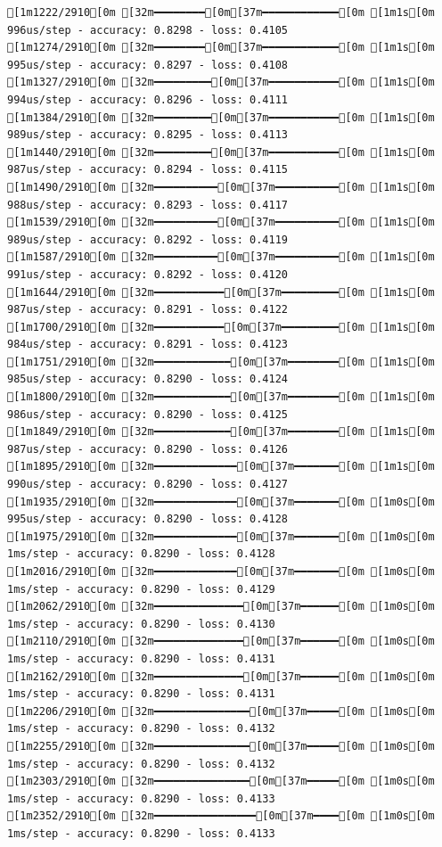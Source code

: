 \documentclass[
  letterpaper,
  DIV=11,
  numbers=noendperiod]{scrartcl}
\begin{document}
\begin{verbatim}
[1m1222/2910[0m [32m━━━━━━━━[0m[37m━━━━━━━━━━━━[0m [1m1s[0m 996us/step - accuracy: 0.8298 - loss: 0.4105
[1m1274/2910[0m [32m━━━━━━━━[0m[37m━━━━━━━━━━━━[0m [1m1s[0m 995us/step - accuracy: 0.8297 - loss: 0.4108
[1m1327/2910[0m [32m━━━━━━━━━[0m[37m━━━━━━━━━━━[0m [1m1s[0m 994us/step - accuracy: 0.8296 - loss: 0.4111
[1m1384/2910[0m [32m━━━━━━━━━[0m[37m━━━━━━━━━━━[0m [1m1s[0m 989us/step - accuracy: 0.8295 - loss: 0.4113
[1m1440/2910[0m [32m━━━━━━━━━[0m[37m━━━━━━━━━━━[0m [1m1s[0m 987us/step - accuracy: 0.8294 - loss: 0.4115
[1m1490/2910[0m [32m━━━━━━━━━━[0m[37m━━━━━━━━━━[0m [1m1s[0m 988us/step - accuracy: 0.8293 - loss: 0.4117
[1m1539/2910[0m [32m━━━━━━━━━━[0m[37m━━━━━━━━━━[0m [1m1s[0m 989us/step - accuracy: 0.8292 - loss: 0.4119
[1m1587/2910[0m [32m━━━━━━━━━━[0m[37m━━━━━━━━━━[0m [1m1s[0m 991us/step - accuracy: 0.8292 - loss: 0.4120
[1m1644/2910[0m [32m━━━━━━━━━━━[0m[37m━━━━━━━━━[0m [1m1s[0m 987us/step - accuracy: 0.8291 - loss: 0.4122
[1m1700/2910[0m [32m━━━━━━━━━━━[0m[37m━━━━━━━━━[0m [1m1s[0m 984us/step - accuracy: 0.8291 - loss: 0.4123
[1m1751/2910[0m [32m━━━━━━━━━━━━[0m[37m━━━━━━━━[0m [1m1s[0m 985us/step - accuracy: 0.8290 - loss: 0.4124
[1m1800/2910[0m [32m━━━━━━━━━━━━[0m[37m━━━━━━━━[0m [1m1s[0m 986us/step - accuracy: 0.8290 - loss: 0.4125
[1m1849/2910[0m [32m━━━━━━━━━━━━[0m[37m━━━━━━━━[0m [1m1s[0m 987us/step - accuracy: 0.8290 - loss: 0.4126
[1m1895/2910[0m [32m━━━━━━━━━━━━━[0m[37m━━━━━━━[0m [1m1s[0m 990us/step - accuracy: 0.8290 - loss: 0.4127
[1m1935/2910[0m [32m━━━━━━━━━━━━━[0m[37m━━━━━━━[0m [1m0s[0m 995us/step - accuracy: 0.8290 - loss: 0.4128
[1m1975/2910[0m [32m━━━━━━━━━━━━━[0m[37m━━━━━━━[0m [1m0s[0m 1ms/step - accuracy: 0.8290 - loss: 0.4128  
[1m2016/2910[0m [32m━━━━━━━━━━━━━[0m[37m━━━━━━━[0m [1m0s[0m 1ms/step - accuracy: 0.8290 - loss: 0.4129
[1m2062/2910[0m [32m━━━━━━━━━━━━━━[0m[37m━━━━━━[0m [1m0s[0m 1ms/step - accuracy: 0.8290 - loss: 0.4130
[1m2110/2910[0m [32m━━━━━━━━━━━━━━[0m[37m━━━━━━[0m [1m0s[0m 1ms/step - accuracy: 0.8290 - loss: 0.4131
[1m2162/2910[0m [32m━━━━━━━━━━━━━━[0m[37m━━━━━━[0m [1m0s[0m 1ms/step - accuracy: 0.8290 - loss: 0.4131
[1m2206/2910[0m [32m━━━━━━━━━━━━━━━[0m[37m━━━━━[0m [1m0s[0m 1ms/step - accuracy: 0.8290 - loss: 0.4132
[1m2255/2910[0m [32m━━━━━━━━━━━━━━━[0m[37m━━━━━[0m [1m0s[0m 1ms/step - accuracy: 0.8290 - loss: 0.4132
[1m2303/2910[0m [32m━━━━━━━━━━━━━━━[0m[37m━━━━━[0m [1m0s[0m 1ms/step - accuracy: 0.8290 - loss: 0.4133
[1m2352/2910[0m [32m━━━━━━━━━━━━━━━━[0m[37m━━━━[0m [1m0s[0m 1ms/step - accuracy: 0.8290 - loss: 0.4133

\end{verbatim}
\end{document}
